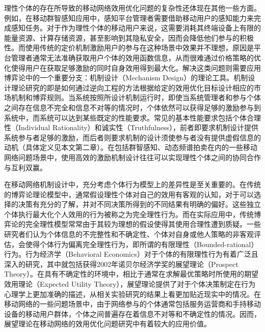 理性个体的存在所导致的移动网络效用优化问题的复杂性还体现在其他一些方面。例如，在移动群智感知应用中，感知平台管理者需要借助移动用户的感知能力来完成感知任务。对于作为理性个体的移动用户来说，这需要消耗其终端设备上有限的能量资源、计算存储资源，甚至影响到其隐私安全，因而会降低他们参与的积极性。而使用传统的定价机制激励用户的参与在这种场景中效果并不理想，原因是平台管理者通常无法准确获取用户个体的效用函数信息，从而很难通过价格策略的优化使得用户在获取足够激励的同时自身效用得到最大化。解决这类问题则需要应用博弈论中的一个重要分支：机制设计（Mechanism Design）的理论工具\cite{Nisan07}。机制设计理论研究的即是如何通过逆向工程的方法根据给定的效用优化目标设计相应的市场机制和博弈规则。当系统按照所设计机制运行时，即使当系统管理者和参与个体之间存在信息不完全和信息不对等的情况时，个体依然可以获得足够的激励参与到系统中，而系统可以达到某些既定的性能要求。常见的基本性能要求包括个体合理性（Individual Rationality）和诚实性（Truthfulness），前者即要求机制设计提供系统参与者足够的激励，而后者则要求机制的设计须使参与者没有提供虚假信息的动机（具体定义见本文第二章）。在包括群智感知、动态频谱拍卖在内的一些移动网络问题场景中，使用高效的激励机制设计往往可以实现理性个体之间的协同合作与互利双赢。

在移动网络机制设计中，充分考虑个体行为模型上的差异性是至关重要的。在传统的博弈论理论模型中，通常假设理性个体对自己的效用有客观的认知，对于可以选择的决策有充分的了解，并对不同决策所得到的不同结果有明确的偏好。这些独立个体执行最大化个人效用的行为被称之为完全理性行为。而在实际应用中，传统博弈论的完全理性模型常常由于其较为理想的假设使得其使用合理性遭到质疑。一些研究者们认为个体信息的不完整性和不确定性、个体对自身或他人策略的非客观评估，会使得个体行为偏离完全理性行为，即所谓的有限理性（Bounded-rational）行为。行为经济学（Behavioral Economics）对于个体的有限理性行为有着广泛且深入的研究，其中就包括获得2002年诺贝尔经济学奖的展望理论（Prospect Theory）\cite{Kahneman}。在具有不确定性的环境中，相比于通常在求解最优策略时所使用的期望效用理论（Expected Utility Theory），展望理论提供了对于个体决策制定在行为心理学上更加准确的描述，从相关实验研究的结果上看更加贴近现实中的情况。在移动网络的一些问题场景中，由于网络参与的个体通常包括服务运营商和手持移动设备的移动用户群体，个体之间普遍存在着信息不对等和不确定性的情况。因而，展望理论在移动网络的效用优化问题研究中有着较大的应用价值。


